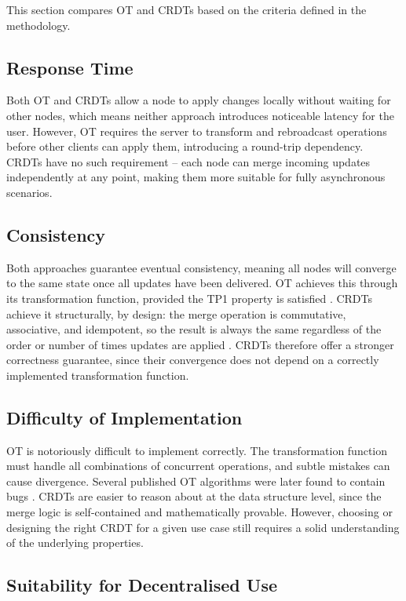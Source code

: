 This section compares OT and CRDTs based on the criteria defined in the methodology.

\subsection{Response Time}

Both OT and CRDTs allow a node to apply changes locally without waiting for other nodes, which means
neither approach introduces noticeable latency for the user. However, OT requires the server to
transform and rebroadcast operations before other clients can apply them, introducing a round-trip
dependency. CRDTs have no such requirement -- each node can merge incoming updates independently
at any point, making them more suitable for fully asynchronous scenarios.

\subsection{Consistency}

Both approaches guarantee eventual consistency, meaning all nodes will converge to the same state
once all updates have been delivered. OT achieves this through its transformation function, provided
the TP1 property is satisfied \cite{nichols1995jupiter}. CRDTs achieve it structurally, by design:
the merge operation is commutative, associative, and idempotent, so the result is always the same
regardless of the order or number of times updates are applied \cite{shapiro2011comprehensive}.
CRDTs therefore offer a stronger correctness guarantee, since their convergence does not depend on
a correctly implemented transformation function.

\subsection{Difficulty of Implementation}

OT is notoriously difficult to implement correctly. The transformation function must handle all
combinations of concurrent operations, and subtle mistakes can cause divergence. Several published
OT algorithms were later found to contain bugs \cite{nichols1995jupiter}. CRDTs are easier to
reason about at the data structure level, since the merge logic is self-contained and mathematically
provable. However, choosing or designing the right CRDT for a given use case still requires a solid
understanding of the underlying properties.

\subsection{Suitability for Decentralised Use}

